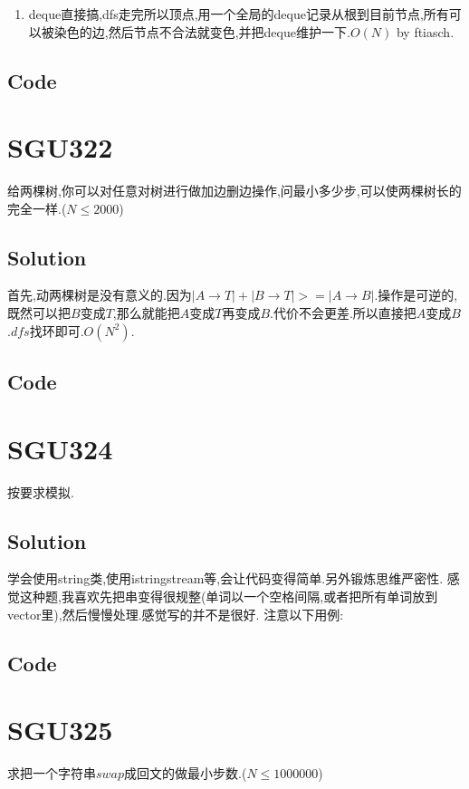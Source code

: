 \documentclass{article}
\newcommand{\includecode}[2][c]{}
\begin{document}
\begin{flushleft}
\begin{enumerate}
\item deque直接搞,dfs走完所以顶点,用一个全局的deque记录从根到目前节点,所有可以被染色的边,然后节点不合法就变色,并把deque维护一下.$O(N)$ by ftiasch.\\
\end{enumerate}

\subsection{Code}
\includecode[C++]{321v1.cc}
\includecode[C++]{321v2.cc}

\section{SGU322}
给两棵树,你可以对任意对树进行做加边删边操作,问最小多少步,可以使两棵树长的完全一样.($N \leq 2000$)\\
\subsection{Solution}
首先,动两棵树是没有意义的.因为$|A \rightarrow T| + |B \rightarrow T| >= |A \rightarrow B|$.操作是可逆的,既然可以把$B$变成$T$,那么就能把$A$变成$T$再变成$B$.代价不会更差.所以直接把$A$变成$B$.$dfs$找环即可.$O(N^2)$.
\subsection{Code}
\includecode[C++]{322.cc}

\section{SGU324}
按要求模拟.
\subsection{Solution}
学会使用string类,使用istringstream等,会让代码变得简单.另外锻炼思维严密性.
感觉这种题,我喜欢先把串变得很规整(单词以一个空格间隔,或者把所有单词放到vector里),然后慢慢处理.感觉写的并不是很好.
注意以下用例:
\includecode[C++]{324in}
\subsection{Code}
\includecode[C++]{324.cc}

\section{SGU325}
求把一个字符串$swap$成回文的做最小步数.($N \leq 1000000$)

\end{flushleft}
\end{document}
